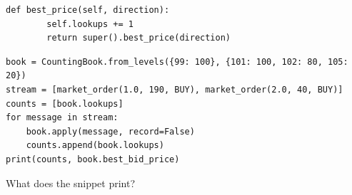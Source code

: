 \begin{question}
\begin{lstlisting}[caption={A book that counts its lookups}, label=listing.lookupsCountedThroughTheInheritedMatchingClass]
    def best_price(self, direction):
        self.lookups += 1
        return super().best_price(direction)
\end{lstlisting}
\begin{lstlisting}[caption={Two market buys}, label=listing.lookupsCountedThroughTheInheritedMatchingRun]
book = CountingBook.from_levels({99: 100}, {101: 100, 102: 80, 105: 20})
stream = [market_order(1.0, 190, BUY), market_order(2.0, 40, BUY)]
counts = [book.lookups]
for message in stream:
    book.apply(message, record=False)
    counts.append(book.lookups)
print(counts, book.best_bid_price)
\end{lstlisting}
What does the snippet print?
\begin{choices}
 \choice {}
 \choice {}
 \choice {}
 \choice {}
 \correctchoice {}
\end{choices}
\end{question}

